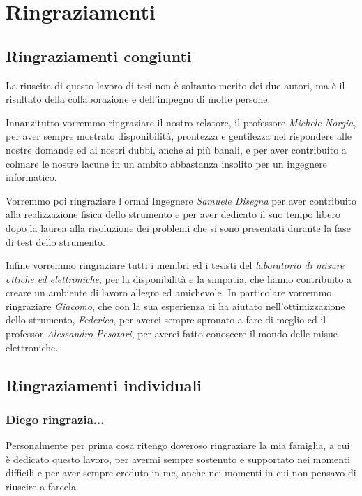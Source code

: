 \chapter*{Ringraziamenti}
\label{ringraziamenti}
\thispagestyle{empty}

\section*{Ringraziamenti congiunti}
La riuscita di questo lavoro di tesi non è soltanto merito dei due autori, ma è il risultato della collaborazione e dell'impegno di molte persone.

Innanzitutto vorremmo ringraziare il nostro relatore, il professore \textit{Michele Norgia}, per aver sempre mostrato disponibilità, prontezza e gentilezza nel rispondere alle nostre domande ed ai nostri dubbi, anche ai più banali, e per aver contribuito a colmare le nostre lacune in un ambito abbastanza insolito per un ingegnere informatico.

Vorremmo poi ringraziare l'ormai Ingegnere \textit{Samuele Disegna} per aver contribuito alla realizzazione fisica dello strumento e per aver dedicato il suo tempo libero dopo la laurea alla risoluzione dei problemi che si sono presentati durante la fase di test dello strumento.

Infine vorremmo ringraziare tutti i membri ed i tesisti del \textit{laboratorio di misure ottiche ed elettroniche}, per la disponibilità e la simpatia, che hanno contribuito a creare un ambiente di lavoro allegro ed amichevole. In particolare vorremmo ringraziare \textit{Giacomo}, che con la sua esperienza ci ha aiutato nell'ottimizzazione dello strumento, \textit{Federico}, per averci sempre spronato a fare di meglio ed il professor \textit{Alessandro Pesatori}, per averci fatto conoscere il mondo delle misue elettroniche.

\section*{Ringraziamenti individuali}
\subsection*{Diego ringrazia...}

Personalmente per prima cosa ritengo doveroso ringraziare la mia famiglia, a cui è dedicato questo lavoro, per avermi sempre sostenuto e supportato nei momenti difficili e per aver sempre creduto in me, anche nei momenti in cui non pensavo di riuscire a farcela.

